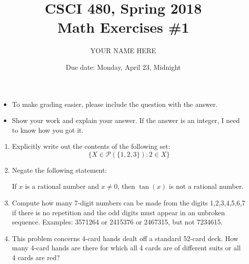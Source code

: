 \documentclass{article}
\title{CSCI 480, Spring 2018\\Math Exercises \#1}
\author{YOUR NAME HERE}
\date{Due date: Monday, April 23, Midnight}
\begin{document}
\maketitle

\begin{itemize}
\item
  To make grading easier, please include the question with
  the answer.
\item
  Show your work and explain your answer.
  If the answer is an integer, I need to know how you
  got it.
\end{itemize}

\begin{enumerate}

\item Explicitly write out the contents of the following set:
  \[ \{X\in \mathcal{P}(\{1,2,3\}) : 2\in X\}\]

\item Negate the following statement:

  If $x$ is a rational number and $x\neq 0$, then $\tan(x)$
  is not a rational number.

\item Compute how many 7-digit numbers can be made from the digits
  1,2,3,4,5,6,7 if there is no repetition and the odd digits must
  appear in an unbroken sequence.  Examples: 3571264 or 2415376 or 2467315,
  but not 7234615.

\item
  This problem concerns 4-card hands dealt off a standard 52-card deck.
  How many 4-card hands are there for which all 4 cards are of different
  suits or all 4 cards are red?

\end{enumerate}
\end{document}
